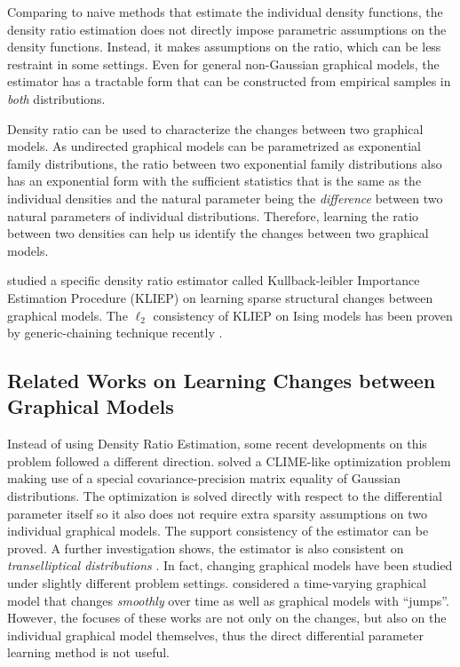 \documentclass[11pt]{article}
\numberwithin{equation}{section}
\numberwithin{theorem}{section}
\theoremstyle{definition}
\theoremstyle{remark}
\begin{document}
Comparing to naive methods that estimate the individual density functions, the density ratio estimation does not directly impose parametric assumptions on the density functions. Instead, it makes assumptions on the ratio, which can be less restraint in some settings. Even for general non-Gaussian graphical models, the estimator has a tractable form that can be constructed from empirical samples in \emph{both} distributions.

Density ratio can be used to characterize the changes between two graphical models. As undirected graphical models can be parametrized as exponential family distributions, the ratio between two exponential family distributions also has an exponential form with the sufficient statistics that is the same as the individual densities and the natural parameter being the \emph{difference} between two natural parameters of individual distributions. Therefore, learning the ratio between two densities can help us identify the changes between two graphical models.

\cite{Liu2014,Liu2016a} studied a specific density ratio estimator called Kullback-leibler Importance Estimation Procedure (KLIEP) \cite{Sugiyama2008} on learning sparse structural changes between graphical models. The $\ell_2$ consistency of KLIEP on Ising models has been proven by generic-chaining technique recently \cite{Fazayeli2016Generalized}. 

\subsection{Related Works on Learning Changes between Graphical Models}
Instead of using Density Ratio Estimation, some recent developments on this problem followed a different direction. \cite{Zhao2014Direct} solved a CLIME-like optimization problem making use of a special covariance-precision matrix equality of Gaussian distributions. The optimization is solved directly with respect to the differential parameter itself so  it also does not require extra sparsity assumptions on two individual graphical models. The support consistency of the estimator can be proved. A further investigation shows, the estimator is also consistent on\emph{ transelliptical distributions} \cite{Xu2016Semiparametric}.
In fact, changing graphical models have been studied under  slightly different problem settings. \cite{kolar10estimating} considered a time-varying graphical model that changes \emph{smoothly} over time as well as graphical models with ``jumps''\cite{kolar10estimating}. However, the focuses of these works are not only on the changes, but also on the individual graphical model themselves, thus the direct differential parameter learning method is not useful.
\end{document}
